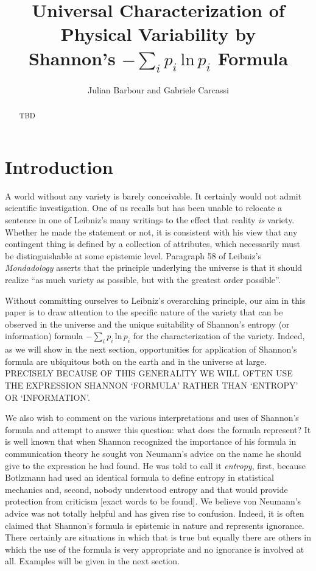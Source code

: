 \documentclass{article}
\title{Universal Characterization of Physical Variability by \\Shannon's $-\sum_ip_i\,\textrm{ln}\,p_i$ Formula}
\author{
	Julian Barbour and 
	Gabriele Carcassi
}
\begin{document}
\maketitle

\tableofcontents

\begin{abstract}
TBD
\end{abstract}




\section{Introduction\label{int}}

A world without any variety is barely conceivable. It certainly would not admit scientific investigation. One of us recalls but has been unable to relocate a sentence in one of Leibniz's many writings to the effect that reality \emph{is} variety. Whether he made the statement or not, it is consistent with his view that any contingent thing is defined by a collection of attributes, which necessarily must be distinguishable
at some epistemic level. Paragraph 58 of Leibniz's \emph{Mondadology} asserts that the principle underlying the universe is that it should realize ``as much variety as possible, but with the greatest order possible''.

Without committing ourselves to Leibniz's overarching principle, our aim in this paper is to draw attention to the specific nature of the variety that can be observed in the universe and the unique suitability of Shannon's entropy (or information) formula $-\sum_ip_i\,\textrm{ln}\,p_i$ for the characterization of the variety. Indeed, as we will show in the next section, opportunities for application of Shannon's formula are ubiquitous both on the earth and in the universe at large. PRECISELY BECAUSE OF THIS GENERALITY WE WILL OFTEN USE THE EXPRESSION SHANNON `FORMULA' RATHER THAN `ENTROPY' OR `INFORMATION'.

We also wish to comment on the various interpretations and uses of Shannon's formula and attempt to answer this question: what does the formula represent? It is well known that when Shannon recognized the importance of his formula in communication theory he sought von Neumann's advice on the name he should give to the expression he had found. He was told to call it \emph{entropy}, first, because Botlzmann had used an identical formula to define entropy in statistical mechanics and, second, nobody understood entropy and that would provide protection from criticism [exact words to be found]. We believe von Neumann's advice was not totally helpful and has given rise to confusion. Indeed, it is often claimed that Shannon's formula is epistemic in nature and represents ignorance. There certainly are situations in which that is true but equally there are others in which the use of the formula is very appropriate and no ignorance is involved at all. Examples will be given in the next section.
\end{document}
